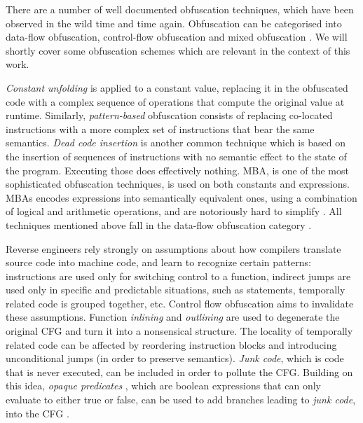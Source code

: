 There are a number of well documented obfuscation techniques, which have been observed in the wild time and time again. Obfuscation can be categorised into data-flow obfuscation, control-flow obfuscation and mixed obfuscation \cite{dang2014practical}. We will shortly cover some obfuscation schemes which are relevant in the context of this work.

\emph{Constant unfolding} is applied to a constant value, replacing it in the obfuscated code with a complex sequence of operations that compute the original value at runtime. Similarly, \emph{pattern-based} obfuscation consists of replacing co-located instructions with a more complex set of instructions that bear the same semantics. \emph{Dead code insertion} is another common technique which is based on the insertion of sequences of instructions with no semantic effect to the state of the program. Executing those does effectively nothing. \gls{MBA}, is one of the most sophisticated obfuscation techniques, is used on both constants and expressions. \glspl{MBA} encodes expressions into semantically equivalent ones, using a combination of logical and arithmetic operations, and are notoriously hard to simplify \cite{zhou2007} \cite{mba_deobf}. All techniques mentioned above fall in the data-flow obfuscation category \cite{dang2014practical}.

Reverse engineers rely strongly on assumptions about how compilers translate source code into machine code, and learn to recognize certain patterns:  instructions are used only for switching control to a function, indirect jumps are used only in specific and predictable situations, such as  statements, temporally related code is grouped together, etc. Control flow obfuscation aims to invalidate these assumptions. Function \emph{inlining} and \emph{outlining} are used to degenerate the original \gls{CFG} and turn it into a nonsensical structure. The locality of temporally related code can be affected by reordering instruction blocks and introducing unconditional jumps (in order to preserve semantics). \emph{Junk code}, which is code that is never executed, can be included in order to pollute the \gls{CFG}. Building on this idea, \emph{opaque predicates} \cite{collberg1997taxonomy}, which are boolean expressions that can only evaluate to either true or false, can be used to add branches leading to \emph{junk code}, into the \gls{CFG} \cite{dang2014practical}.

